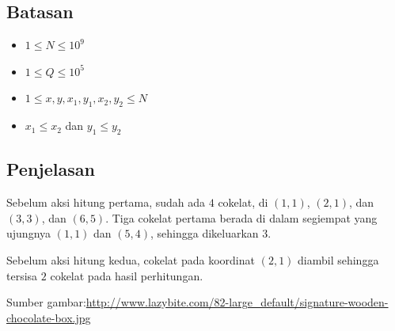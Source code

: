 \documentclass{article}
\begin{document}
\subsection*{Batasan}

\begin{itemize}
  \item $1 \leq N \leq 10^9$
  \item $1 \leq Q \leq 10^5$
  \item $1 \leq x, y, x_1, y_1, x_2, y_2 \leq N$
  \item $x_1 \leq x_2$ dan $y_1 \leq y_2$
\end{itemize}

\subsection*{Penjelasan}

\par\noindent Sebelum aksi hitung pertama, sudah ada $4$ cokelat, di $(1,1)$, $(2,1)$, dan $(3,3)$, dan $(6,5)$. Tiga cokelat pertama berada di dalam segiempat yang ujungnya $(1,1)$ dan $(5,4)$, sehingga dikeluarkan $3$.

\par\noindent Sebelum aksi hitung kedua, cokelat pada koordinat $(2,1)$ diambil sehingga tersisa $2$ cokelat pada hasil perhitungan.

\par\noindent Sumber gambar:\url{http://www.lazybite.com/82-large_default/signature-wooden-chocolate-box.jpg}
\end{document}
